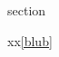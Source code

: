 \documentclass{article}
\begin{document}
\lipsum[1-6]

\ExplSyntaxOn\makeatletter
\ExplSyntaxOff\makeatother{}\label{blub}section\tagstructend
%
%
%
%
%

\lipsum 

xx\ref{blub}
\end{document}
